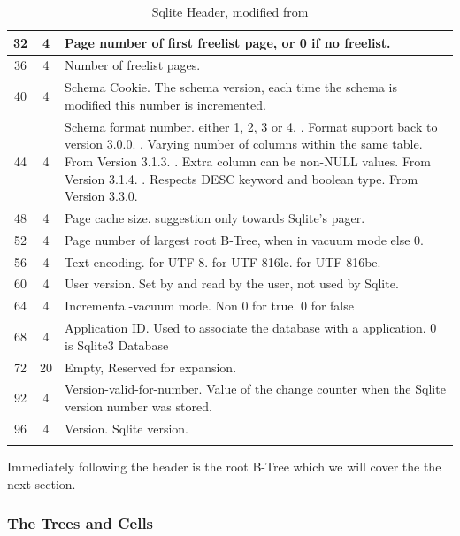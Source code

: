 \begin{longtable}[h]{| c | c | p{10cm} |}
		\hline
			32 & 4 & Page number of first freelist page, or 0 if no freelist. \\
		\hline
			36 & 4 & Number of freelist pages. \\
		\hline
			40 & 4 & Schema Cookie. The schema version, each time the schema is modified this number is incremented. \\
		\hline
			44 & 4 & Schema format number. either 1, 2, 3 or 4. \newline
			1. Format support back to version 3.0.0. \newline
			2. Varying number of columns within the same table. From Version 3.1.3. \newline 
			3. Extra column can be non-NULL values. From Version 3.1.4. \newline
			4. Respects DESC keyword and boolean type. From Version 3.3.0. \newline \\
		\hline
			48 & 4 & Page cache size. suggestion only towards Sqlite's pager. \\
		\hline
			52 & 4 & Page number of largest root B-Tree, when in vacuum mode else 0. \\
		\hline
			56 & 4 & Text encoding. \newline
			 1 for UTF-8. \newline 
			 2 for UTF-816le. \newline 
			 3 for UTF-816be. \\
		\hline
			60 & 4 & User version. Set by and read by the user, not used by Sqlite. \\
		\hline
			64 & 4 & Incremental-vacuum mode. Non 0 for true. 0 for false \\
		\hline
			68 & 4 & Application ID. Used to associate the database with a application. 0 is Sqlite3 Database \\
		\hline
			72 & 20 & Empty, Reserved for expansion. \\
		\hline
			92 & 4 & Version-valid-for-number. Value of the change counter when the Sqlite version number was stored. \\
		\hline
			96 & 4 & Version. Sqlite version. \\
		\hline
	\caption{Sqlite Header, modified from \cite{sqlite}}
	\label{tbl:sqlite_header}
\end{longtable}

Immediately following the header is the root B-Tree which we will cover the the next section.

\subsubsection{The Trees and Cells}
\label{subsubsec:sqlite_trees_and_cells}

